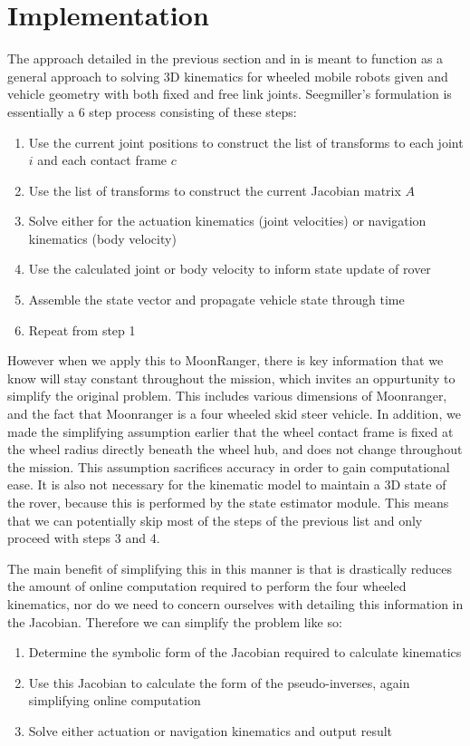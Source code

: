 \documentclass[12pt]{article}
\begin{document}
\section{Implementation}
The approach detailed in the previous section and in \cite{Seegmiller-2014-7945} is meant to function as a general approach to solving 3D kinematics for wheeled mobile robots given and vehicle geometry with both fixed and free link joints. 
Seegmiller's formulation is essentially a 6 step process consisting of these steps: 
\begin{enumerate}
    \item Use the current joint positions to construct the list of transforms to each joint $i$ and each contact frame $c$
    \item Use the list of transforms to construct the current Jacobian matrix $A$
    \item Solve either for the actuation kinematics (joint velocities) or navigation kinematics (body velocity)
    \item Use the calculated joint or body velocity to inform state update of rover
    \item Assemble the state vector and propagate vehicle state through time
    \item Repeat from step 1
\end{enumerate}

However when we apply this to MoonRanger, there is key information that we know will stay constant throughout the mission, which invites an oppurtunity to simplify the original problem. 
This includes various dimensions of Moonranger, and the fact that Moonranger is a four wheeled skid steer vehicle. 
In addition, we made the simplifying assumption earlier that the wheel contact frame is fixed at the wheel radius directly beneath the wheel hub, and does not change throughout the mission. 
This assumption sacrifices accuracy in order to gain computational ease. 
It is also not necessary for the kinematic model to maintain a 3D state of the rover, because this is performed by the state estimator module. 
This means that we can potentially skip most of the steps of the previous list and only proceed with steps 3 and 4. 

The main benefit of simplifying this in this manner is that is drastically reduces the amount of online computation required to perform the four wheeled kinematics, nor do we need to concern ourselves with detailing this information in the Jacobian. 
Therefore we can simplify the problem like so:
\begin{enumerate}
    \item Determine the symbolic form of the Jacobian required to calculate kinematics
    \item Use this Jacobian to calculate the form of the pseudo-inverses, again simplifying online computation
    \item Solve either actuation or navigation kinematics and output result
\end{enumerate}
\end{document}
